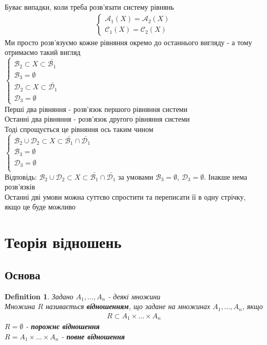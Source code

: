 \documentclass[a4paper, 14pt]{extarticle}
\theoremstyle{theoremdd}
\theoremstyle{theoremdd}
\newtheorem{definition}[theorem]{Definition}
\theoremstyle{theoremdd}
\theoremstyle{theoremdd}
\theoremstyle{theoremdd}
\theoremstyle{theoremdd}
\theoremstyle{theoremdd}
\theoremstyle{theoremdd}
\begin{document}
Буває випадки, коли треба розв'язати систему рівнянь
\begin{align*}
\begin{cases}
\mathcal{A}_1(X) = \mathcal{A}_2(X) \\
\mathcal{C}_1(X) = \mathcal{C}_2(X)
\end{cases}
\end{align*}
Ми просто розв'язуємо кожне рівняння окремо до останнього вигляду - а тому отримаємо такий вигляд\\
$\begin{cases}
 \mathcal{B}_2 \subset X \subset \bar{\mathcal{B}_1} \\
 \mathcal{B}_3 = \emptyset \\
  \mathcal{D}_2 \subset X \subset \bar{\mathcal{D}_1} \\
 \mathcal{D}_3 = \emptyset
\end{cases}
$\\
Перші два рівняння - розв'язок першого рівняння системи \\ Останні два рівняння - розв'язок другого рівняння системи\\
Тоді спрощується це рівняння ось таким чином \\
$\begin{cases}
\mathcal{B}_2 \cup \mathcal{D}_2 \subset X \subset \bar{\mathcal{B}_1} \cap \bar{\mathcal{D}_1} \\
\mathcal{B}_3 = \emptyset \\
\mathcal{D}_3 = \emptyset \\
\end{cases}$\\
Відповідь: $\mathcal{B}_2 \cup \mathcal{D}_2 \subset X \subset \bar{\mathcal{B}_1} \cap \bar{\mathcal{D}_1}$ за умовами $\mathcal{B}_3 = \emptyset$,
$\mathcal{D}_3 = \emptyset$. Інакше нема розв'язків\\
Останні дві умови можна суттєво спростити та переписати її в одну стрічку, якщо це буде можливо
\newpage

\section{Теорія відношень}
\subsection{Основа}
\begin{definition}
Задано $A_1,\dots,A_n$ - деякі множини\\
Множина $R$ називається \textbf{відношенням}, що задане на множинах $A_1,\dots,A_n$, якщо
\begin{align*}
R \subset A_1 \times \dots \times A_n
\end{align*}
$R = \emptyset$ - \textbf{порожнє відношення} \\
$R = A_1 \times \dots \times A_n$ - \textbf{повне відношення}
\end{definition}
\end{document}
